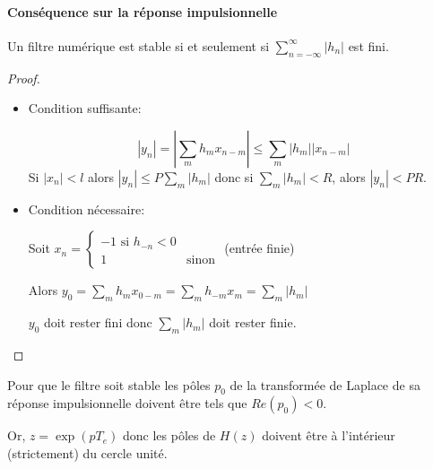 \documentclass[main.tex]{subfiles}
\begin{document}
\paragraph{Conséquence sur la réponse impulsionnelle}
\begin{prop}
Un filtre numérique est stable si et seulement si $\sum_{n=-\infty}^{\infty} |h_n|$ est fini.
\end{prop}
\begin{proof}~
  \begin{itemize}
  \item Condition suffisante:

\[ |y_n| = |\sum_m h_m x_{n-m}| \leq \sum_m|h_m||x_{n-m}| \]
Si $|x_n|<l$ alors $|y_n| \leq P \sum_m |h_m|$ donc si $\sum_m |h_m|<R$, alors $|y_n| < PR$.\\

\item Condition nécessaire:

Soit $x_n =
\begin{cases}
  -1 \text{ si } h_{-n} < 0\\
  1 & \text{sinon}
\end{cases}$
(entrée finie)

Alors $y_0 = \sum_m h_m x_{0-m} = \sum_m h_{-m} x_m = \sum_m |h_m|$

$y_0$ doit rester fini donc $\sum_m |h_m|$ doit rester finie.

\end{itemize}
\end{proof}

\begin{prop}
Pour que le filtre soit stable les pôles $p_0$  de la transformée de Laplace de sa réponse impulsionnelle doivent être tels que $Re(p_0) < 0$.

Or, $z = \exp(pT_e)$ donc les pôles de $H(z)$ doivent être à l'intérieur (strictement) du cercle unité.
\end{prop}
\end{document}
